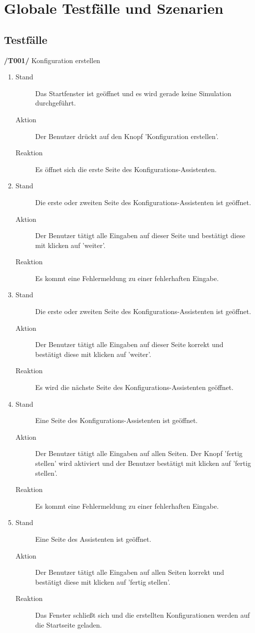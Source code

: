 
\section{Globale Testfälle und Szenarien}

  
\newcommand{\testfall}[4][]{
  \begin{description}
    \item[Stand] #2
    \item[Aktion] #3
    \item[Reaktion] #4
  \end{description}
}

\subsection{Testfälle}



\textbf{/T001/} Konfiguration erstellen
\begin{enumerate}
\item \testfall{Das Startfenster ist geöffnet und es wird gerade keine Simulation durchgeführt.}
{Der Benutzer drückt auf den Knopf 'Konfiguration erstellen'.}
{Es öffnet sich die erste Seite des Konfigurations-Assistenten.}

\item \testfall{Die erste oder zweiten Seite des Konfigurations-Assistenten ist geöffnet.}
{Der Benutzer tätigt alle Eingaben auf dieser Seite und bestätigt diese mit klicken auf 'weiter'.}
{Es kommt eine Fehlermeldung zu einer fehlerhaften Eingabe.}

\item \testfall{Die erste oder zweiten Seite des Konfigurations-Assistenten ist geöffnet.}
{Der Benutzer tätigt alle Eingaben auf dieser Seite korrekt und bestätigt diese mit klicken auf 'weiter'.}
{Es wird die nächste Seite des Konfigurations-Assistenten geöffnet.}

\item \testfall{Eine Seite des Konfigurations-Assistenten ist geöffnet.}
{Der Benutzer tätigt alle Eingaben auf allen Seiten. Der Knopf 'fertig stellen' wird aktiviert und der Benutzer bestätigt mit klicken auf 'fertig stellen'.}
{Es kommt eine Fehlermeldung zu einer fehlerhaften Eingabe.}

\item \testfall{Eine Seite des Assistenten ist geöffnet.}
{Der Benutzer tätigt alle Eingaben auf allen Seiten korrekt und bestätigt diese mit klicken auf 'fertig stellen'.}
{Das Fenster schließt sich und die erstellten Konfigurationen werden auf die Startseite geladen.}


\end{enumerate}

